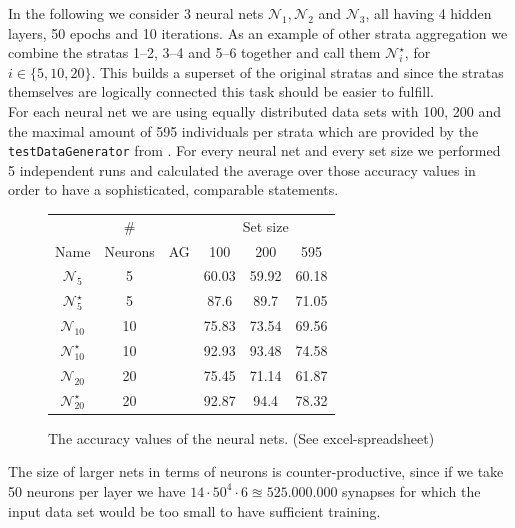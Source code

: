 \documentclass[runningheads]{llncs}
\newcommand{\cmark}{\ding{51}}%
\newcommand{\xmark}{\ding{55}}%
\begin{document}
	In the following we consider 3 neural nets $\mathcal{N}_1,\mathcal{N}_2$ and $\mathcal{N}_3$, all having 4 hidden layers, 50 epochs and 10 iterations.	
	As an example of other strata aggregation we combine the stratas 1--2, 3--4 and 5--6 together and call them $\mathcal{N}_i^\star$, for $i \in \{5,10,20\}$. This builds a superset of the original stratas and since the stratas themselves are logically connected this task should be easier to fulfill.\\
	
	For each neural net we are using equally distributed data sets with 100, 200 and the maximal amount of 595 individuals per strata which are provided by the \texttt{testDataGenerator} from . For every neural net and every set size we performed 5 independent runs and calculated the average over those accuracy values in order to have a sophisticated, comparable statements. 
	\setlength\tabcolsep{.2cm}
	\begin{figure}[H]
		\centering
		\begin{tabular}{|c|c|c|c|c|c|}
			\hline
			&   \#    &        & \multicolumn{3}{c|}{Set size} \\
			Name           & Neurons &   AG   &  100  &  200  &      595      \\ \hline
			$\mathcal{N}_5$      &    5    & \xmark & 60.03 & 59.92 &     60.18     \\
			$\mathcal{N}_5^\star$   &    5    & \cmark & 87.6  & 89.7  &     71.05     \\
			$\mathcal{N}_{10}$    &   10    & \xmark & 75.83 & 73.54 &     69.56     \\
			$\mathcal{N}_{10}^\star$ &   10    & \cmark & 92.93 & 93.48 &     74.58     \\		
			$\mathcal{N}_{20}$    &   20    & \xmark & 75.45 & 71.14 &     61.87     \\
			$\mathcal{N}_{20}^\star$ &   20    & \cmark & 92.87 & 94.4  &     78.32     \\ \hline
		\end{tabular}
		\caption{The accuracy values of the neural nets. (See excel-spreadsheet)}
		\label{tab: nn-accuracy}
	\end{figure}
	
	The size of larger nets in terms of neurons is counter-productive, since if we take 50 neurons per layer we have $14 \cdot 50^4 \cdot 6 \approxeq 525.000.000$ synapses for which the input data set would be too small to have sufficient training.\\
	
\end{document}
